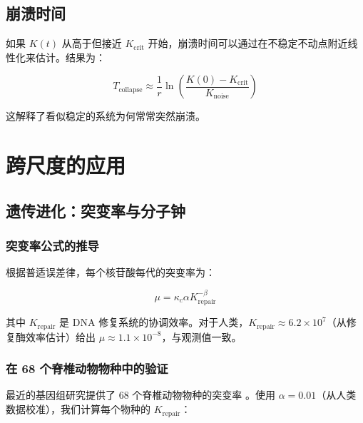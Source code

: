 \documentclass[12pt,a4paper]{article}
\theoremstyle{remark}
\newcommand{\Keffcrit}{K_{\mathrm{crit}}}
\newcommand{\kappac}{\kappa_c}
\begin{document}
	\subsection{崩溃时间}
	
	如果 $K(t)$ 从高于但接近 $\Keffcrit$ 开始，崩溃时间可以通过在不稳定不动点附近线性化来估计。结果为：
	
	\begin{equation}
		T_{\text{collapse}} \approx \frac{1}{r} \ln\left( \frac{K(0) - \Keffcrit}{K_{\text{noise}}} \right)
		\label{eq:collapse-time}
	\end{equation}
	
	这解释了看似稳定的系统为何常常突然崩溃。
	
	\section{跨尺度的应用}
	\label{sec:applications}
	
	\subsection{遗传进化：突变率与分子钟}
	\label{subsec:genetic}
	
	\subsubsection{突变率公式的推导}
	
	根据普适误差律，每个核苷酸每代的突变率为：
	
	\begin{equation}
		\mu = \kappac \alpha K_{\text{repair}}^{-\beta}
		\label{eq:mutation-rate}
	\end{equation}
	
	其中 $K_{\text{repair}}$ 是 DNA 修复系统的协调效率。对于人类，$K_{\text{repair}} \approx 6.2 \times 10^7$（从修复酶效率估计）给出 $\mu \approx 1.1 \times 10^{-8}$，与观测值一致。
	
	\subsubsection{在 68 个脊椎动物物种中的验证}
	
	最近的基因组研究提供了 68 个脊椎动物物种的突变率 \cite{Bergeron2023}。使用 $\alpha = 0.01$（从人类数据校准），我们计算每个物种的 $K_{\text{repair}}$：
	
\end{document}
